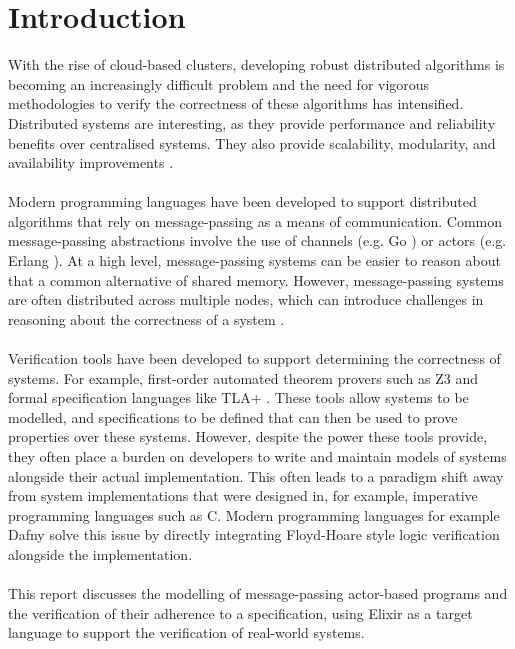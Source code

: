 \chapter{Introduction}
With the rise of cloud-based clusters, developing robust distributed algorithms is becoming an increasingly difficult problem and the need for vigorous methodologies to verify the correctness of these algorithms has intensified. Distributed systems are interesting, as they provide performance and reliability benefits over centralised systems. They also provide scalability, modularity, and availability improvements \cite{cachin}.
\\ \\ 
Modern programming languages have been developed to support distributed algorithms that rely on message-passing as a means of communication. Common message-passing abstractions involve the use of channels (e.g. Go \cite{go}) or actors \cite{actor} (e.g. Erlang \cite{erlang}). At a high level, message-passing systems can be easier to reason about that a common alternative of shared memory. However, message-passing systems are often distributed across multiple nodes, which can introduce challenges in reasoning about the correctness of a system \cite{science_of_systems}.
\\ \\
Verification tools have been developed to support determining the correctness of systems. For example, first-order automated theorem provers such as Z3 \cite{z3} and formal specification languages like TLA+ \cite{tlaplus}. These tools allow systems to be modelled, and specifications to be defined that can then be used to prove properties over these systems. However, despite the power these tools provide, they often place a burden on developers to write and maintain models of systems alongside their actual implementation. This often leads to a paradigm shift away from system implementations that were designed in, for example, imperative programming languages such as C. Modern programming languages for example Dafny \cite{dafny} solve this issue by directly integrating Floyd-Hoare style logic verification alongside the implementation.
\\ \\
This report discusses the modelling of message-passing actor-based programs and the verification of their adherence to a specification, using Elixir as a target language to support the verification of real-world systems.
